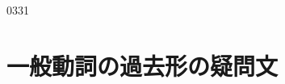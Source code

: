 \documentclass[aspectratio=169,xcolor={dvipsnames,table}]{beamer}
\newcommand{\myaudio}[1]{\href{#1}{\faVolumeUp}}
\begin{document}
\begin{frame}
\begin{block}
\hfill%
%
\hfill\mbox{}

\end{block}
\vspace{-10pt}
%
 \mbox{}\hfill{\tiny 0331}\,{\scriptsize \myaudio{./audio/027_past_did_you_01.mp3}}

\end{frame}


\section{一般動詞の過去形の疑問文}
\end{document}
